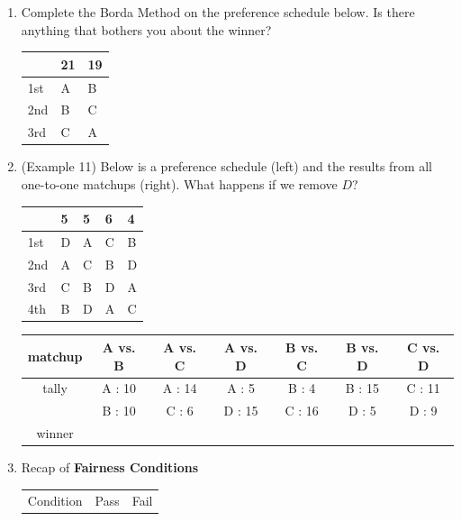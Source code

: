 \documentclass[12pt]{article}
\renewcommand{\emph}[1]{\textsf{\textbf{#1}}}
\begin{document}
\begin{enumerate}
\item Complete the Borda Method on the preference schedule below. Is there anything that bothers you about the winner?

\begin{tabular}{l || l l}
& 21&19\\
\hline
1st&A&B\\
2nd&B&C\\
3rd&C&A\\
\end{tabular}

\vfill

 \emph{}

\vspace{1in}
	
\item  (Example 11) Below is a preference schedule (left) and the results from all one-to-one matchups (right). What happens if we remove $D$?

\hspace*{-.3in}
\begin{tabular}{l || llll}
&5&5&6&4\\
\hline
1st&D&A&C&B\\
2nd&A&C&B&D\\
3rd&C&B&D&A\\
4th&B&D&A&C\\
\end{tabular}
\quad \hfill
\begin{tabular}{c || c c c c c c}
matchup& A vs. B& A vs. C& A vs. D & B vs. C& B vs. D & C vs. D \\
\hline
tally & A : 10&A :  14 &A :  5&B :  4 &B  : 15&C  :  11 \\
&B :  10 &C :  6 &D  : 15&C  :  16&D  :  5& D  :  9\\
\hline
winner &&&&&&\\
\end{tabular}

\vfill

\emph{}

\vspace{1in}

\newpage

\item Recap of \emph{Fairness Conditions}

\begin{tabular}{p{} p{} p{}}
Condition & Pass & Fail
\end{tabular}



\end{enumerate}
\end{document}
